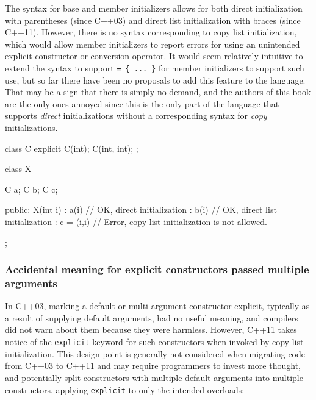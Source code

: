 The syntax for base and member initializers allows for both direct
initialization with parentheses (since C++03) and direct list
initialization with braces (since C++11). However, there is no syntax
corresponding to copy list initialization, which would allow member
initializers to report errors for using an unintended explicit
constructor or conversion operator. It would seem relatively intuitive
to extend the syntax to support
\lstinline!=!~\lstinline!{!~\lstinline!...!~\lstinline!}! for member initializers to
support such use, but so far there have been no proposals to add this
feature to the language. That may be a sign that there is simply no
demand, and the authors of this book are the only ones annoyed since
this is the only part of the language that supports \emph{direct}
initializations without a corresponding syntax for \emph{copy}
initializations.

\begin{emcppslisting}
class C
{
    explicit C(int);
    C(int, int);
};

class X
{
    C a;
    C b;
    C c;

public:
    X(int i)
    : a(i)       // OK, direct initialization
    : b(i)       // OK, direct list initialization
    : c = (i,i)  // Error, copy list initialization is not allowed.
    {
    }
};
\end{emcppslisting}


\subsubsection[Accidental meaning for explicit constructors passed multiple arguments]{Accidental meaning for explicit constructors passed multiple arguments}\label{accidental-meaning-for-explicit-constructors-passed-multiple-arguments}

In C++03, marking a default or multi-argument constructor explicit,
typically as a result of supplying default arguments, had no useful
meaning, and compilers did not warn about them because they were
harmless. However, C++11 takes notice of the \lstinline!explicit! keyword
for such constructors when invoked by copy list initialization. This
design point is generally not considered when migrating code from C++03
to C++11 and may require programmers to invest more thought, and
potentially split constructors with multiple default arguments into
multiple constructors, applying \lstinline!explicit! to only the intended
overloads:

